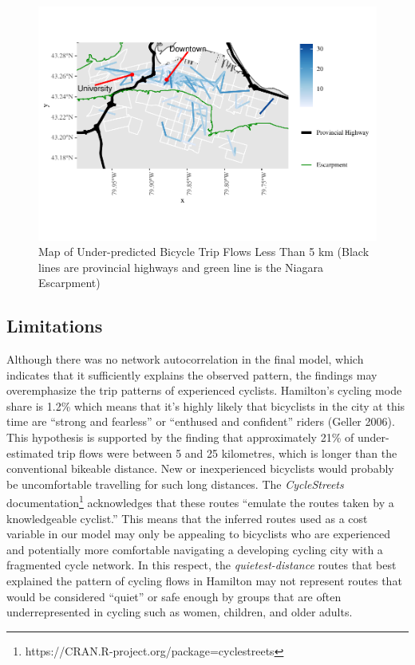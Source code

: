 \documentclass[smallextended]{svjour3}       %
\begin{document}
\begin{figure}
\centering
\includegraphics{Correlates-cycling-flows-routes_files/figure-latex/residuals-under-5km-1.pdf}
\caption{\label{fig:residuals-under-5km} Map of Under-predicted Bicycle
Trip Flows Less Than 5 km (Black lines are provincial highways and green
line is the Niagara Escarpment)}
\end{figure}

\hypertarget{limitations}{%
\subsection{Limitations}\label{limitations}}

Although there was no network autocorrelation in the final model, which
indicates that it sufficiently explains the observed pattern, the
findings may overemphasize the trip patterns of experienced cyclists.
Hamilton's cycling mode share is 1.2\% which means that it's highly
likely that bicyclists in the city at this time are ``strong and
fearless'' or ``enthused and confident'' riders (Geller 2006). This
hypothesis is supported by the finding that approximately 21\% of
under-estimated trip flows were between 5 and 25 kilometres, which is
longer than the conventional bikeable distance. New or inexperienced
bicyclists would probably be uncomfortable travelling for such long
distances. The \emph{CycleStreets}
documentation\footnote{https://CRAN.R-project.org/package=cyclestreets}
acknowledges that these routes ``emulate the routes taken by a
knowledgeable cyclist.'' This means that the inferred routes used as a
cost variable in our model may only be appealing to bicyclists who are
experienced and potentially more comfortable navigating a developing
cycling city with a fragmented cycle network. In this respect, the
\emph{quietest-distance} routes that best explained the pattern of
cycling flows in Hamilton may not represent routes that would be
considered ``quiet'' or safe enough by groups that are often
underrepresented in cycling such as women, children, and older adults.
\end{document}
